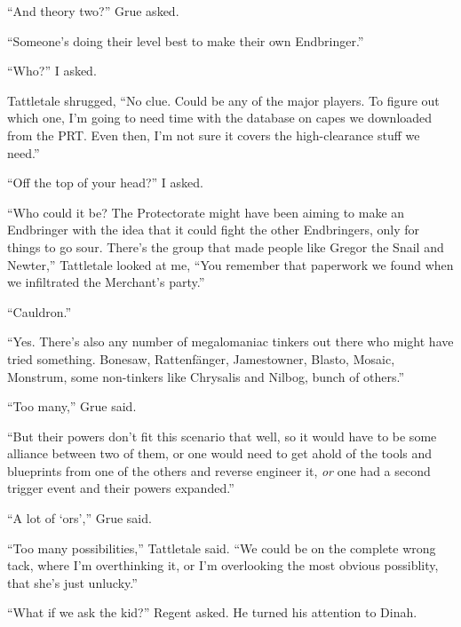 ``And theory two?''  Grue asked.



``Someone's doing their level best to make their own Endbringer.''



``Who?'' I asked.



Tattletale shrugged, ``No clue.  Could be any of the major players.  To figure out which one, I'm going to need time with the database on capes we downloaded from the PRT.  Even then, I'm not sure it covers the high-clearance stuff we need.''



``Off the top of your head?''  I asked.



``Who could it be?  The Protectorate might have been aiming to make an Endbringer with the idea that it could fight the other Endbringers, only for things to go sour.  There's the group that made people like Gregor the Snail and Newter,'' Tattletale looked at me, ``You remember that paperwork we found when we infiltrated the Merchant's party.''



``Cauldron.''



``Yes.  There's also any number of megalomaniac tinkers out there who might have tried something. Bonesaw, Rattenf\"{a}nger, Jamestowner, Blasto, Mosaic, Monstrum, some non-tinkers like Chrysalis and Nilbog, bunch of others.''



``Too many,'' Grue said.



``But their powers don't fit this scenario that well, so it would have to be some alliance between two of them, or one would need to get ahold of the tools and blueprints from one of the others and reverse engineer it, \emph{or} one had a second trigger event and their powers expanded.''



``A lot of `ors','' Grue said.



``Too many possibilities,'' Tattletale said.  ``We could be\emph{ }on the complete wrong tack, where I'm overthinking it, or I'm overlooking the most obvious possiblity, that she's just unlucky.''



``What if we ask the kid?'' Regent asked.  He turned his attention to Dinah.



